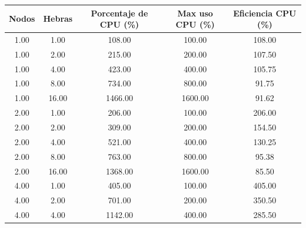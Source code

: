 \begin{table}[ht]
    \centering
    \begin{tabular}{|c|c|c|c|c|}
        \hline
        \textbf{Nodos} & \textbf{Hebras} & \textbf{Porcentaje de CPU (\%)} & \textbf{Max uso CPU (\%)} & \textbf{Eficiencia CPU (\%)} \\
        \hline
        1.00           & 1.00            & 108.00                          & 100.00                    & 108.00                       \\
        1.00           & 2.00            & 215.00                          & 200.00                    & 107.50                       \\
        1.00           & 4.00            & 423.00                          & 400.00                    & 105.75                       \\
        1.00           & 8.00            & 734.00                          & 800.00                    & 91.75                        \\
        1.00           & 16.00           & 1466.00                         & 1600.00                   & 91.62                        \\
        2.00           & 1.00            & 206.00                          & 100.00                    & 206.00                       \\
        2.00           & 2.00            & 309.00                          & 200.00                    & 154.50                       \\
        2.00           & 4.00            & 521.00                          & 400.00                    & 130.25                       \\
        2.00           & 8.00            & 763.00                          & 800.00                    & 95.38                        \\
        2.00           & 16.00           & 1368.00                         & 1600.00                   & 85.50                        \\
        4.00           & 1.00            & 405.00                          & 100.00                    & 405.00                       \\
        4.00           & 2.00            & 701.00                          & 200.00                    & 350.50                       \\
        4.00           & 4.00            & 1142.00                         & 400.00                    & 285.50                       \\

\end{tabular}
\end{table}
